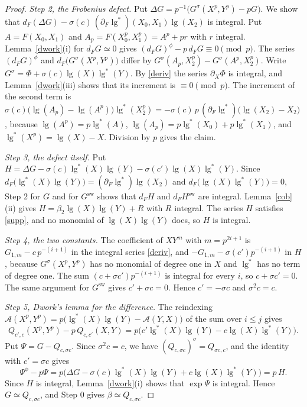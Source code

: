 \begin{proof}
\emph{Step 2, the Frobenius defect.} Put $\Delta G=p^{-1}\big(G^\sigma(X^p,Y^p)-pG\big)$. We show that $d_F(\Delta G)-\sigma(c)\,(\partial_F\operatorname{lg}^\ast)(X_0,X_1)\operatorname{lg}(X_2)$ is integral. Put $A=F(X_0,X_1)$ and $A_p=F(X_0^p,X_1^p)=A^p+pr$ with $r$ integral. Lemma~\ref{dwork}(i) for $d_FG\simeq0$ gives $(d_FG)^\phi-p\,d_FG\equiv0\pmod p$. The series $(d_FG)^\phi$ and $d_F\big(G^\sigma(X^p,Y^p)\big)$ differ by $G^\sigma(A_p,X_2^p)-G^\sigma(A^p,X_2^p)$. Write $G^\sigma=\Phi+\sigma(c)\operatorname{lg}(X)\operatorname{lg}^\ast(Y)$. By \eqref{deriv} the series $\partial_X\Phi$ is integral, and Lemma~\ref{dwork}(iii) shows that its increment is $\equiv0\pmod p$. The increment of the second term is $\sigma(c)\big(\operatorname{lg}(A_p)-\operatorname{lg}(A^p)\big)\operatorname{lg}^\ast(X_2^p)=-\sigma(c)\,p\,(\partial_F\operatorname{lg}^\ast)\big(\operatorname{lg}(X_2)-X_2\big)$, because $\operatorname{lg}(A^p)=p\operatorname{lg}^\ast(A)$, $\operatorname{lg}(A_p)=p\operatorname{lg}^\ast(X_0)+p\operatorname{lg}^\ast(X_1)$, and $\operatorname{lg}^\ast(X^p)=\operatorname{lg}(X)-X$. Division by $p$ gives the claim.

\emph{Step 3, the defect itself.} Put $H=\Delta G-\sigma(c)\operatorname{lg}^\ast(X)\operatorname{lg}(Y)-\sigma(c')\operatorname{lg}(X)\operatorname{lg}^\ast(Y)$. Since $d_F\big(\operatorname{lg}^\ast(X)\operatorname{lg}(Y)\big)=(\partial_F\operatorname{lg}^\ast)\operatorname{lg}(X_2)$ and $d_F\big(\operatorname{lg}(X)\operatorname{lg}^\ast(Y)\big)=0$, Step 2 for $G$ and for $G^{\mathrm{sw}}$ shows that $d_FH$ and $d_FH^{\mathrm{sw}}$ are integral. Lemma~\ref{cob}(ii) gives $H=\beta_2\operatorname{lg}(X)\operatorname{lg}(Y)+R$ with $R$ integral. The series $H$ satisfies \eqref{supp}, and no monomial of $\operatorname{lg}(X)\operatorname{lg}(Y)$ does, so $H$ is integral.

\emph{Step 4, the two constants.} The coefficient of $XY^m$ with $m=p^{2i+1}$ is $G_{1,m}-c\,p^{-(i+1)}$ in the integral series \eqref{deriv}, and $-G_{1,m}-\sigma(c')p^{-(i+1)}$ in $H$, because $G^\sigma(X^p,Y^p)$ has no monomial of degree one in $X$ and $\operatorname{lg}^\ast$ has no term of degree one. The sum $(c+\sigma c')p^{-(i+1)}$ is integral for every $i$, so $c+\sigma c'=0$. The same argument for $G^{\mathrm{sw}}$ gives $c'+\sigma c=0$. Hence $c'=-\sigma c$ and $\sigma^2c=c$.

\emph{Step 5, Dwork's lemma for the difference.} The reindexing $\mathcal A(X^p,Y^p)=p\big(\operatorname{lg}^\ast(X)\operatorname{lg}(Y)-\mathcal A(Y,X)\big)$ of the sum over $i\le j$ gives
\[
Q_{c',c}(X^p,Y^p)-p\,Q_{c,c'}(X,Y)=p\big(c'\operatorname{lg}^\ast(X)\operatorname{lg}(Y)-c\operatorname{lg}(X)\operatorname{lg}^\ast(Y)\big).
\]
Put $\Psi=G-Q_{c,\sigma c}$. Since $\sigma^2c=c$, we have $(Q_{c,\sigma c})^\sigma=Q_{\sigma c,c}$, and the identity with $c'=\sigma c$ gives
\[
\Psi^\phi-p\Psi=p\big(\Delta G-\sigma(c)\operatorname{lg}^\ast(X)\operatorname{lg}(Y)+c\operatorname{lg}(X)\operatorname{lg}^\ast(Y)\big)=p\,H .
\]
Since $H$ is integral, Lemma~\ref{dwork}(i) shows that $\exp\Psi$ is integral. Hence $G\simeq Q_{c,\sigma c}$, and Step 0 gives $\beta\simeq Q_{c,\sigma c}$.
\end{proof}

